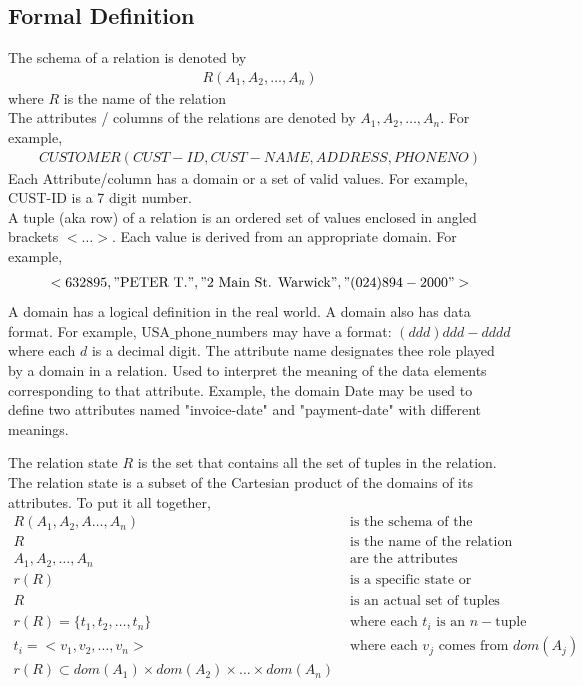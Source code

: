 \documentclass[a4paper]{article}
\theoremstyle{plain}
\theoremstyle{definition}
\newtheorem{defn}{Definition}[section]
\theoremstyle{remark}
\begin{document}
	\subsection{Formal Definition}
	The schema of a relation is denoted by
	\begin{align*}
		R(A_1,A_2,\ldots,A_n)
	\end{align*}
	where $R$ is the name of the relation \\
	The attributes / columns of the relations are denoted by $A_1,A_2,\ldots,A_n$.
	For example, 
	\begin{align*}
		CUSTOMER(CUST-ID,CUST-NAME,ADDRESS,PHONENO)
	\end{align*}
	Each Attribute/column has a domain or a set of valid values. For example, CUST-ID is a 7 digit number. \\
	A tuple (aka row) of a relation is an ordered set of values enclosed in angled brackets $<\ldots>$. Each value is derived from an appropriate domain. For example,
	\begin{align*}
		<632895, "\text{PETER T.}", "\text{2 Main St. Warwick}", "(024) 894-2000">
	\end{align*}
	A domain has a logical definition in the real world. A domain also has data format. For example, USA$\_$phone$\_$numbers may have a format: $(ddd)ddd-dddd$ where each $d $ is a decimal digit. The attribute name designates thee role played by a domain in a relation. Used to interpret the meaning of the data elements corresponding to that attribute. Example, the domain Date may be used to define two attributes named "invoice-date" and "payment-date" with different meanings.
	\begin{tcolorbox}[colback=black!3!white,colframe=black!60!white,title=\begin{defn}Relation State \label{Relation State}\end{defn}]
	The relation state $R$ is the set that contains all the set of tuples in the relation. The relation state is a subset of the Cartesian product of the domains of its attributes. To put it all together,
	\begin{align*}
		R(A_1,A_2,A\ldots,A_n) &\text{ is the schema of the relation} \\
		R &\text{ is the name of the relation} \\
		A_1,A_2,\ldots,A_n &\text{ are the attributes (columns) of the relation} \\
		r(R) &\text{ is a specific state or instance of relation } \\
		R &\text{ is an actual set of tuples (rows)} \\
		r(R) = \{t_1,t_2,\ldots,t_n\} &\text{ where each $t_i$ is an $n-$tuple} \\
		t_i = <v_1,v_2,\ldots,v_n> &\text{ where each $v_j$ comes from }dom(A_j) \\
		r(R) \subset dom(A_1)\times dom(A_2) \times \ldots \times dom(A_n)
	\end{align*}
	\end{tcolorbox}
\end{document}
